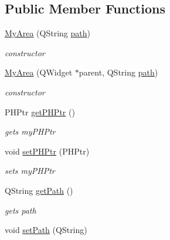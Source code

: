 \subsection*{Public Member Functions}
\begin{DoxyCompactItemize}
\item 
\hyperlink{classMyArea_a31f13e95c83414c538b6c46e55e19c79}{My\+Area} (Q\+String \hyperlink{classMyArea_a70561a408470de740f580da6717871bf}{path})
\begin{DoxyCompactList}\small\item\em constructor \end{DoxyCompactList}\item 
\hyperlink{classMyArea_af3c945c22987982a37dc47dad0c24615}{My\+Area} (Q\+Widget $\ast$parent, Q\+String \hyperlink{classMyArea_a70561a408470de740f580da6717871bf}{path})
\begin{DoxyCompactList}\small\item\em constructor \end{DoxyCompactList}\item 
\hypertarget{classMyArea_a7b94b516e730ddcee16d946c76bbc2b3}{P\+H\+Ptr \hyperlink{classMyArea_a7b94b516e730ddcee16d946c76bbc2b3}{get\+P\+H\+Ptr} ()}\label{classMyArea_a7b94b516e730ddcee16d946c76bbc2b3}

\begin{DoxyCompactList}\small\item\em gets my\+P\+H\+Ptr \end{DoxyCompactList}\item 
\hypertarget{classMyArea_a087c389370070a348af025aaee620fc8}{void \hyperlink{classMyArea_a087c389370070a348af025aaee620fc8}{set\+P\+H\+Ptr} (P\+H\+Ptr)}\label{classMyArea_a087c389370070a348af025aaee620fc8}

\begin{DoxyCompactList}\small\item\em sets my\+P\+H\+Ptr \end{DoxyCompactList}\item 
\hypertarget{classMyArea_a84edb9791a8c988cb9f13ac1ef2025d5}{Q\+String \hyperlink{classMyArea_a84edb9791a8c988cb9f13ac1ef2025d5}{get\+Path} ()}\label{classMyArea_a84edb9791a8c988cb9f13ac1ef2025d5}

\begin{DoxyCompactList}\small\item\em gets path \end{DoxyCompactList}\item 
\hypertarget{classMyArea_ab1f574dcb5318131128deb076743f01a}{void \hyperlink{classMyArea_ab1f574dcb5318131128deb076743f01a}{set\+Path} (Q\+String)}\label{classMyArea_ab1f574dcb5318131128deb076743f01a}


\end{DoxyCompactItemize}
